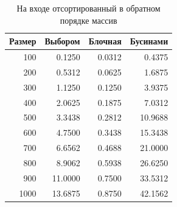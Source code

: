 \begin{table}[h]
	\begin{center}
		\begin{threeparttable}
		\captionsetup{justification=raggedright,singlelinecheck=off}
		\caption{На входе отсортированный в обратном порядке массив}
		\label{tbl:worst}
		\begin{tabular}{|r|r|r|r|}
			\hline
			Размер & Выбором & Блочная & Бусинами \\
			\hline
  			  100 & 0.1250 & 0.0312 & 0.4375 \\ 
  			\hline
  			200 & 0.5312 & 0.0625 & 1.6875 \\ 
  			\hline
  			300 & 1.1250 & 0.1250 & 3.9375 \\ 
  			\hline
  			400 & 2.0625 & 0.1875 & 7.0312 \\ 
  			\hline
  			500 & 3.3438 & 0.2812 & 10.9688 \\ 
  			\hline
  			600 & 4.7500 & 0.3438 & 15.3438 \\ 
  			\hline
  			700 & 6.6562 & 0.4688 & 21.0000 \\ 
  			\hline
  			800 & 8.9062 & 0.5938 & 26.6250 \\ 
  			\hline
  			900 & 11.0000 & 0.7500 & 33.5312 \\ 
  			\hline
  			1000 & 13.6875 & 0.8750 & 42.1562 \\ 
  			\hline
  			
		\end{tabular}
		\end{threeparttable}
    \end{center}
\end{table}

\clearpage

